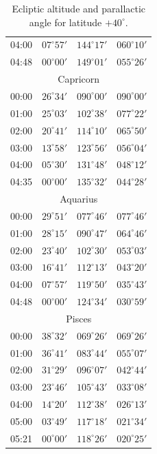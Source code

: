 \begin{table}[!h]
\begin{Parallel}{}{}
{{\begin{tabular}{l|lll}
04:00 & $07^\circ 57'$ & $144^\circ 17'$ & $060^\circ 10'$\\
04:48 & $00^\circ 00'$ & $149^\circ 01'$ & $055^\circ 26'$\\
\multicolumn{4}{c}{Capricorn}\\
00:00 & $26^\circ 34'$ & $090^\circ 00'$ & $090^\circ 00'$\\
01:00 & $25^\circ 03'$ & $102^\circ 38'$ & $077^\circ 22'$\\
02:00 & $20^\circ 41'$ & $114^\circ 10'$ & $065^\circ 50'$\\
03:00 & $13^\circ 58'$ & $123^\circ 56'$ & $056^\circ 04'$\\
04:00 & $05^\circ 30'$ & $131^\circ 48'$ & $048^\circ 12'$\\
04:35 & $00^\circ 00'$ & $135^\circ 32'$ & $044^\circ 28'$\\
\multicolumn{4}{c}{Aquarius}\\
00:00 & $29^\circ 51'$ & $077^\circ 46'$ & $077^\circ 46'$\\
01:00 & $28^\circ 15'$ & $090^\circ 47'$ & $064^\circ 46'$\\
02:00 & $23^\circ 40'$ & $102^\circ 30'$ & $053^\circ 03'$\\
03:00 & $16^\circ 41'$ & $112^\circ 13'$ & $043^\circ 20'$\\
04:00 & $07^\circ 57'$ & $119^\circ 50'$ & $035^\circ 43'$\\
04:48 & $00^\circ 00'$ & $124^\circ 34'$ & $030^\circ 59'$\\
\multicolumn{4}{c}{Pisces}\\
00:00 & $38^\circ 32'$ & $069^\circ 26'$ & $069^\circ 26'$\\
01:00 & $36^\circ 41'$ & $083^\circ 44'$ & $055^\circ 07'$\\
02:00 & $31^\circ 29'$ & $096^\circ 07'$ & $042^\circ 44'$\\
03:00 & $23^\circ 46'$ & $105^\circ 43'$ & $033^\circ 08'$\\
04:00 & $14^\circ 20'$ & $112^\circ 38'$ & $026^\circ 13'$\\
05:00 & $03^\circ 49'$ & $117^\circ 18'$ & $021^\circ 34'$\\
05:21 & $00^\circ 00'$ & $118^\circ 26'$ & $020^\circ 25'$\\
\end{tabular}
}}
\end{Parallel}
\caption{Ecliptic altitude and parallactic angle for latitude $+40^\circ$.}
\end{table}

